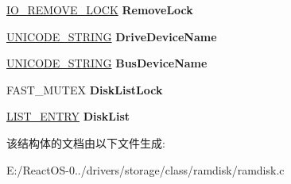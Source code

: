 \begin{DoxyCompactItemize}
\hyperlink{struct___i_o___r_e_m_o_v_e___l_o_c_k}{I\+O\+\_\+\+R\+E\+M\+O\+V\+E\+\_\+\+L\+O\+CK} {\bfseries Remove\+Lock}
\item 
\mbox{\label{struct___r_a_m_d_i_s_k___e_x_t_e_n_s_i_o_n_a43859dafd48f6d53f3d7bc468eb69d8a}} 
\hyperlink{struct___u_n_i_c_o_d_e___s_t_r_i_n_g}{U\+N\+I\+C\+O\+D\+E\+\_\+\+S\+T\+R\+I\+NG} {\bfseries Drive\+Device\+Name}
\item 
\mbox{\label{struct___r_a_m_d_i_s_k___e_x_t_e_n_s_i_o_n_a39e762406cbe1932bf722e2952effacd}} 
\hyperlink{struct___u_n_i_c_o_d_e___s_t_r_i_n_g}{U\+N\+I\+C\+O\+D\+E\+\_\+\+S\+T\+R\+I\+NG} {\bfseries Bus\+Device\+Name}
\item 
\mbox{\label{struct___r_a_m_d_i_s_k___e_x_t_e_n_s_i_o_n_a915d5a406e1df7b9ec71180d88ffa718}} 
F\+A\+S\+T\+\_\+\+M\+U\+T\+EX {\bfseries Disk\+List\+Lock}
\item 
\mbox{\label{struct___r_a_m_d_i_s_k___e_x_t_e_n_s_i_o_n_a36a33dad45ea7e57f125fdc2f3c49a50}} 
\hyperlink{struct___l_i_s_t___e_n_t_r_y}{L\+I\+S\+T\+\_\+\+E\+N\+T\+RY} {\bfseries Disk\+List}
\end{DoxyCompactItemize}


该结构体的文档由以下文件生成\+:\begin{DoxyCompactItemize}
\item 
E\+:/\+React\+O\+S-\/0../drivers/storage/class/ramdisk/ramdisk.\+c\end{DoxyCompactItemize}
